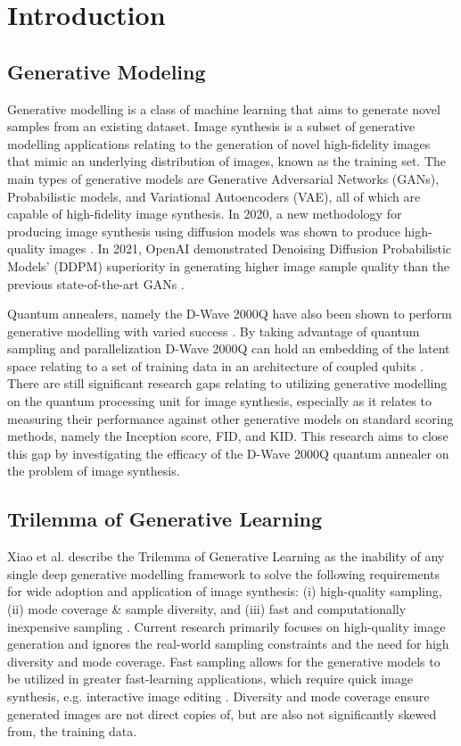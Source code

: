 \documentclass[technologies,article,accept,pdftex,moreauthors]{Definitions/mdpi}
\begin{document}
 
\section{Introduction}
\subsection{Generative Modeling}
 
Generative modelling is a class of machine learning that aims to generate novel samples from an existing dataset. Image synthesis is a subset of generative modelling applications relating to the generation of novel high-fidelity images that mimic an underlying distribution of images, known as the training set. The main types of generative models are Generative Adversarial Networks (GANs), Probabilistic models, and Variational Autoencoders (VAE), all of which are capable of high-fidelity image synthesis. In 2020, a new methodology for producing image synthesis using diffusion models was shown to produce high-quality images \cite{ho2020denoising}. In 2021, OpenAI demonstrated Denoising Diffusion Probabilistic Models' (DDPM) superiority in generating higher image sample quality than the previous state-of-the-art GANs \cite{dhariwal2021diffusion}.   %

Quantum annealers, namely the D-Wave 2000Q have also been shown to perform generative modelling with varied success \cite{Jain2020}\cite{Thulasidasan2016}. By taking advantage of quantum sampling and parallelization D-Wave 2000Q can hold an embedding of the latent space relating to a set of training data in an architecture of coupled qubits \cite{Amin_2018}. There are still significant research gaps relating to utilizing generative modelling on the quantum processing unit for image synthesis, especially as it relates to measuring their performance against other generative models on standard scoring methods, namely the Inception score, FID, and KID. This research aims to close this gap by investigating the efficacy of the D-Wave 2000Q quantum annealer on the problem of image synthesis.

\subsection{Trilemma of Generative Learning}
\label{trilemmaGL}
Xiao et al. describe the Trilemma of Generative Learning as the inability of any single deep generative modelling framework to solve the following requirements for wide adoption and application of image synthesis: (i) high-quality sampling, (ii) mode coverage & sample diversity, and (iii) fast and computationally inexpensive sampling \cite{xiao2022DDGAN}. Current research primarily focuses on high-quality image generation and ignores the real-world sampling constraints and the need for high diversity and mode coverage. Fast sampling allows for the generative models to be utilized in greater fast-learning applications, which require quick image synthesis, e.g. interactive image editing \cite{xiao2022DDGAN}. Diversity and mode coverage ensure generated images are not direct copies of, but are also not significantly skewed from, the training data.
\end{document}
